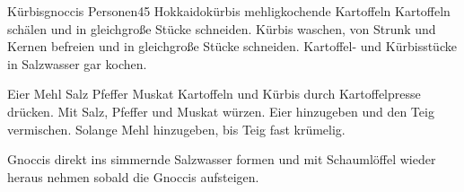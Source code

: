 \begin{MyRecipe}{Kürbisgnoccis}{ Personen}{\SI{45}{\minuteprime}}
	\ingredient[\Calc{0.5}{\x}]{\si{\kilogram}} {Hokkaidokürbis}
	\ingredient[\Calc{0.5}{\x}]{\si{\kilogram}} {mehligkochende Kartoffeln}
	Kartoffeln schälen und in gleichgroße Stücke schneiden. Kürbis waschen, von Strunk und Kernen befreien und in gleichgroße Stücke schneiden. Kartoffel- und Kürbisstücke in Salzwasser gar kochen.\par\bigskip
	
	\ingredient[\Calc{2}{\x}]{} {Eier}
	 {Mehl}
	\ingredient[]{} {Salz}
	\ingredient[]{} {Pfeffer}
	\ingredient[]{} {Muskat}
	Kartoffeln und Kürbis durch Kartoffelpresse drücken. Mit Salz, Pfeffer und Muskat würzen. Eier hinzugeben und den Teig vermischen. Solange Mehl hinzugeben, bis Teig fast krümelig.\par\bigskip
	
 	Gnoccis direkt ins simmernde Salzwasser formen und mit Schaumlöffel wieder heraus nehmen sobald die Gnoccis aufsteigen.
	
	
	
	
	
\end{MyRecipe}